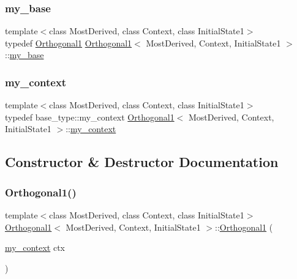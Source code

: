 \subsubsection{\texorpdfstring{my\+\_\+base}{my\_base}}
{\footnotesize\ttfamily template$<$class Most\+Derived, class Context, class Initial\+State1$>$ \\
typedef \mbox{\hyperlink{struct_orthogonal1}{Orthogonal1}} \mbox{\hyperlink{struct_orthogonal1}{Orthogonal1}}$<$ Most\+Derived, Context, Initial\+State1 $>$\+::\mbox{\hyperlink{struct_orthogonal1_a14beb6cc5bb2d03c3fe75d554a09a0a9}{my\+\_\+base}}}

\mbox{\label{struct_orthogonal1_a8cee9db1dad468ee5f8e34871d7a4ae2}} 
\subsubsection{\texorpdfstring{my\+\_\+context}{my\_context}}
{\footnotesize\ttfamily template$<$class Most\+Derived, class Context, class Initial\+State1$>$ \\
typedef base\+\_\+type\+::my\+\_\+context \mbox{\hyperlink{struct_orthogonal1}{Orthogonal1}}$<$ Most\+Derived, Context, Initial\+State1 $>$\+::\mbox{\hyperlink{struct_orthogonal1_a8cee9db1dad468ee5f8e34871d7a4ae2}{my\+\_\+context}}}



\subsection{Constructor \& Destructor Documentation}
\mbox{\label{struct_orthogonal1_acbb5711e5434d30316340781fec8fc22}} 
\subsubsection{\texorpdfstring{Orthogonal1()}{Orthogonal1()}}
{\footnotesize\ttfamily template$<$class Most\+Derived, class Context, class Initial\+State1$>$ \\
\mbox{\hyperlink{struct_orthogonal1}{Orthogonal1}}$<$ Most\+Derived, Context, Initial\+State1 $>$\+::\mbox{\hyperlink{struct_orthogonal1}{Orthogonal1}} (\begin{DoxyParamCaption}\item[{\mbox{\hyperlink{struct_orthogonal1_a8cee9db1dad468ee5f8e34871d7a4ae2}{my\+\_\+context}}}]{ctx }\end{DoxyParamCaption})\hspace{0.3cm}{\ttfamily [inline]}}

